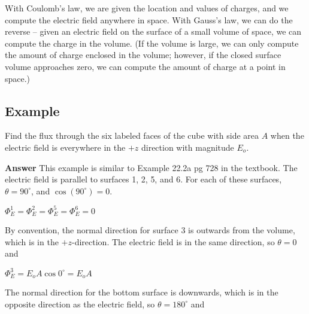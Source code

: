 \documentclass{article}
\begin{document}

With Coulomb's law, we are given the location and values of charges, and we compute the electric field anywhere in space. With Gauss's law, we can do the reverse -- given an electric field on the surface of a small volume of space, we can compute the charge in the volume. (If the volume is large, we can only compute the amount of charge enclosed in the volume; however, if the closed surface volume approaches zero, we can compute the amount of charge at a point in space.)

\subsection{Example}



Find the flux through the six labeled faces of the cube with side area $A$ when the electric field is everywhere in the $+z$ direction with magnitude $E_o$.

{\bf Answer} This example is similar to Example 22.2a pg 728 in the textbook. The electric field is parallel to surfaces 1, 2, 5, and 6. For each of these surfaces, $\theta=90^\circ$, and $\cos( 90^\circ)=0$. 



$\Phi_E^{1}=\Phi_E^{2}=\Phi_E^{5}=\Phi_E^{6}=0$

By convention, the normal direction for surface 3 is outwards from the volume, which is in the $+z$-direction. The electric field is in the same direction, so $\theta=0$ and

$\Phi_E^{3}=E_oA\cos0^\circ=E_oA$

The normal direction for the bottom surface is downwards, which is in the opposite direction as the electric field, so $\theta=180^\circ$ and
\end{document}
